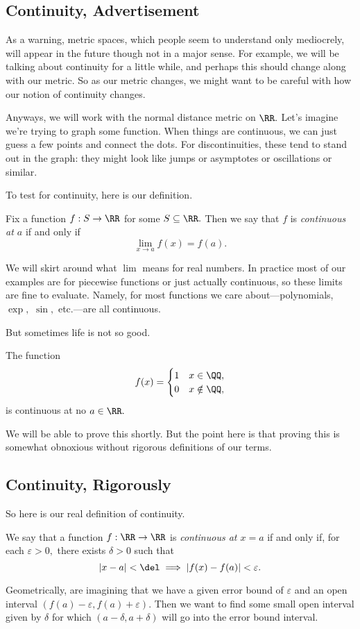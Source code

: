 \subsection{Continuity, Advertisement}
As a warning, metric spaces, which people seem to understand only mediocrely, will appear in the future though not in a major sense. For example, we will be talking about continuity for a little while, and perhaps this should change along with our metric. So as our metric changes, we might want to be careful with how our notion of continuity changes.

Anyways, we will work with the normal distance metric on $\RR.$ Let's imagine we're trying to graph some function. When things are continuous, we can just guess a few points and connect the dots. For discontinuities, these tend to stand out in the graph: they might look like jumps or asymptotes or oscillations or similar.

To test for continuity, here is our definition.
\begin{definition}[Continuity, I]
	Fix a function $f:S\to\RR$ for some $S\subseteq\RR.$ Then we say that $f$ is \textit{continuous at $a$} if and only if
	\[\lim_{x\to a}f(x)=f(a).\]
\end{definition}
We will skirt around what $\lim$ means for real numbers. In practice most of our examples are for piecewise functions or just actually continuous, so these limits are fine to evaluate. Namely, for most functions we care about---polynomials, $\exp,$ $\sin,$ etc.---are all continuous.

But sometimes life is not so good.
\begin{example}
	The function
	\[f(x)=\begin{cases}
		1 & x\in\QQ, \\
		0 & x\notin\QQ,
	\end{cases}\]
	is continuous at no $a\in\RR.$
\end{example}
We will be able to prove this shortly. But the point here is that proving this is somewhat obnoxious without rigorous definitions of our terms.

\subsection{Continuity, Rigorously}
So here is our real definition of continuity.
\begin{definition}[Continuity, II]
	We say that a function $f:\RR\to\RR$ is \textit{continuous at $x=a$} if and only if, for each $\varepsilon>0,$ there exists $\delta>0$ such that
	\[|x-a|<\del\implies|f(x)-f(a)|<\varepsilon.\]
\end{definition}
Geometrically, are imagining that we have a given error bound of $\varepsilon$ and an open interval $(f(a)-\varepsilon,f(a)+\varepsilon).$ Then we want to find some small open interval given by $\delta$ for which $(a-\delta,a+\delta)$ will go into the error bound interval.

